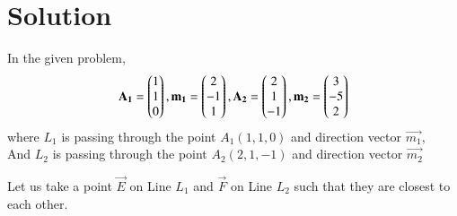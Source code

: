 \documentclass[journal,12pt,twocolumn]{IEEEtran}
\begin{document}
\section{Solution}
In the given problem,
\begin{align}\label{e3}
    \mathbf{A_1} = \begin{pmatrix}1 \\ 1 \\ 0\end{pmatrix}, \mathbf{m_1} = \begin{pmatrix}2 \\ -1 \\ 1\end{pmatrix}, \mathbf{A_2} = \begin{pmatrix}2 \\ 1 \\ -1\end{pmatrix}, \mathbf{m_2} = \begin{pmatrix}3 \\ -5 \\ 2\end{pmatrix}
\end{align}
where $L_1$ is passing through the point $A_1(1,1,0)$ and direction vector $\vec{m_1}$,\\
And $L_2$ is passing through the point $A_2(2,1,-1)$ and direction vector $\vec{m_2}$

Let us take a point $\vec{E}$ on Line $L_1$ and $\vec{F}$ on Line $L_2$ such that they are closest to each other.
\end{document}
